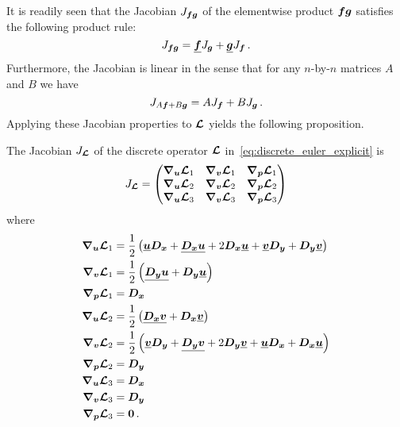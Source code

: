 It is readily seen that the Jacobian $J_{\bm{f}\bm{g}}$ of the elementwise product $\bm{f}\bm{g}$ satisfies the following product rule:
\begin{equation}
  \label{eq:jacobian_product_rule}
  J_{\bm{f}\bm{g}} = \underline{\bm{f}}J_{\bm{g}} + \underline{\bm{g}}J_{\bm{f}} \,.
\end{equation}
Furthermore, the Jacobian is linear in the sense that for any $n$-by-$n$ matrices $A$ and $B$ we have
\begin{equation}
  \label{eq:jacobian_linear}
  J_{A\bm{f} + B\bm{g}} = AJ_{\bm{f}} + BJ_{\bm{g}} \,.
\end{equation}
Applying these Jacobian properties to $\bm{\mathcal{L}}$ yields the following proposition.

\begin{proposition}
  The Jacobian $J_{\bm{\mathcal{L}}}$ of the discrete operator $\bm{\mathcal{L}}$ in~\eqref{eq:discrete_euler_explicit} is
  \begin{equation*}
    J_{\bm{\mathcal{L}}} =
    \begin{pmatrix}
      \bm{\nabla}_{\bm{u}} \bm{\mathcal{L}}_1 & \bm{\nabla}_{\bm{v}} \bm{\mathcal{L}}_1 & \bm{\nabla}_{\bm{p}} \bm{\mathcal{L}}_1 \\
      \bm{\nabla}_{\bm{u}} \bm{\mathcal{L}}_2 & \bm{\nabla}_{\bm{v}} \bm{\mathcal{L}}_2 & \bm{\nabla}_{\bm{p}} \bm{\mathcal{L}}_2 \\
      \bm{\nabla}_{\bm{u}} \bm{\mathcal{L}}_3 & \bm{\nabla}_{\bm{v}} \bm{\mathcal{L}}_3 & \bm{\nabla}_{\bm{p}} \bm{\mathcal{L}}_3
    \end{pmatrix}
  \end{equation*}
  where
  \begin{align*}
    \bm{\nabla}_{\bm{u}} \bm{\mathcal{L}}_1 &= \frac{1}{2} \left(\underline{\bm{u}}\bm{D_x} + \underline{\bm{D_x}\bm{u}} + 2\bm{D_x}\underline{\bm{u}} + \underline{\bm{v}}\bm{D_y} + \bm{D_y}\underline{\bm{v}}\right) \\
    \bm{\nabla}_{\bm{v}} \bm{\mathcal{L}}_1 &= \frac{1}{2} \left(\underline{\bm{D_y}\bm{u}} + \bm{D_y}\underline{\bm{u}}\right) \\
    \bm{\nabla}_{\bm{p}} \bm{\mathcal{L}}_1 &= \bm{D_x} \\
    \bm{\nabla}_{\bm{u}} \bm{\mathcal{L}}_2 &= \frac{1}{2} \left(\underline{\bm{D_x}\bm{v}} + \bm{D_x}\underline{\bm{v}}\right) \\
    \bm{\nabla}_{\bm{v}} \bm{\mathcal{L}}_2 &= \frac{1}{2} \left(\underline{\bm{v}}\bm{D_y} + \underline{\bm{D_y}\bm{v}} + 2\bm{D_y}\underline{\bm{v}} + \underline{\bm{u}}\bm{D_x} + \bm{D_x}\underline{\bm{u}}\right) \\
    \bm{\nabla}_{\bm{p}} \bm{\mathcal{L}}_2 &= \bm{D_y} \\
    \bm{\nabla}_{\bm{u}} \bm{\mathcal{L}}_3 &= \bm{D_x} \\
    \bm{\nabla}_{\bm{v}} \bm{\mathcal{L}}_3 &= \bm{D_y} \\
    \bm{\nabla}_{\bm{p}} \bm{\mathcal{L}}_3 &= \bm{0} \,.
  \end{align*}
\end{proposition}

